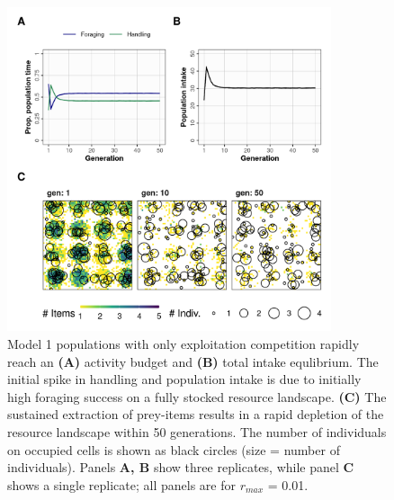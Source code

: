 \documentclass[11pt]{article}
\begin{document}
\begin{figure}[h!]
    \centering
    \includegraphics[width=0.85\textwidth]{figures/fig_02.png}
    \caption{
        Model 1 populations with only exploitation competition rapidly reach an \textbf{(A)} activity budget and \textbf{(B)} total intake equlibrium. The initial spike in handling and population intake is due to initially high foraging success on a fully stocked resource landscape.
        \textbf{(C)} The sustained extraction of prey-items results in a rapid depletion of the resource landscape within 50 generations. The number of individuals on occupied cells is shown as black circles (size = number of individuals). Panels \textbf{A, B} show three replicates, while panel \textbf{C} shows a single replicate; all panels are for $r_{max}$ = 0.01.
    }
    \label{Fig:Model1}
\end{figure}
\end{document}
